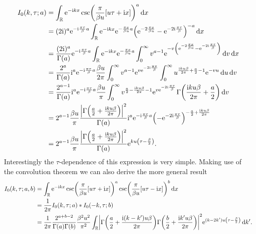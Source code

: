 \documentclass[english, parskip=full]{scrartcl}
\begin{document}
\begin{align}
I_0(k,\tau; a) &= \intr{\powe{-\i kx} \csc\kla*{\frac{\pi}{\beta u} \klb*{u\tau + \i x}}^a}{x} \\
&= (2\i)^a \powe{-\i \frac{\pi\tau}{\beta}a} \intr{\powe{-\i kx} \powe{-\frac{\pi x}{\beta u}a} \kla*{\powe{-2\frac{\pi x}{\beta u}} - \powe{-2\i\frac{\pi\tau}{\beta}}}^{-a} }{x}\\
&= \frac{(2\i)^a}{\Gamma(a)} \powe{-\i \frac{\pi\tau}{\beta}a} \intr{\powe{-\i kx} \powe{-\frac{\pi x}{\beta u}a } \intx{0}{\infty}{v^{a-1} \powe{-v\kla*{\powe{-2\frac{\pi x}{\beta u}} - \powe{-2\i\frac{\pi\tau}{\beta}}}} }{v}}{x}\\
&= \frac{2^{a}}{\Gamma(a)} \i^a \powe{-\i \frac{\pi\tau}{\beta}a} \frac{\beta u}{2\pi} \intx{0}{\infty}{v^{a-1} \powe{v\powe{-2\i\frac{\pi\tau}{\beta}}} \intx{0}{\infty}{u^{\frac{\i ku\beta}{2\pi} + \frac{a}{2} - 1} \powe{-vu}}{u} }{v}\\
&= \frac{2^{a-1}}{\Gamma(a)} \i^a \powe{-\i \frac{\pi\tau}{\beta}a} \frac{\beta u}{\pi} \intx{0}{\infty}{v^{\frac{a}{2} - \frac{\i ku\beta}{2\pi} - 1} \powe{v\powe{-2\i\frac{\pi\tau}{\beta}}} \Gamma\kla*{\frac{\i ku\beta}{2\pi} + \frac{a}{2}} }{v}\\
&= 2^{a-1} \frac{\beta u}{\pi} \frac{\abs*{\Gamma\kla*{\frac{a}{2} + \frac{\i ku\beta}{2\pi}}}^2}{\Gamma(a)} \i^a \powe{-\i \frac{\pi\tau}{\beta}a} \kla*{-\powe{-2\i\frac{\pi\tau}{\beta}}}^{-\frac{a}{2} + \frac{\i ku\beta}{2\pi}} \\
&= 2^{a-1} \frac{\beta u}{\pi} \frac{\abs*{\Gamma\kla*{\frac{a}{2} + \frac{\i ku\beta}{2\pi}}}^2}{\Gamma(a)} \powe{ku\kla*{\tau - \frac{\beta}{2}}}.
\end{align}
Interestingly the $\tau$-dependence of this expression is very simple.
Making use of the convolution theorem we can also derive the more general result
\begin{align}
I_0(k,\tau;a,b) &= \intr{\powe{-\i kx} \csc\kla*{\frac{\pi}{\beta u} \klb*{u\tau + \i x}}^a \csc\kla*{\frac{\pi}{\beta u} \klb*{u\tau - \i x}}^b}{x}\\
&= \frac{1}{2\pi} I_0(k,\tau;a) \ast I_0(-k,\tau;b)\\
&= \frac{1}{2\pi} \frac{2^{a+b-2}}{\Gamma(a)\Gamma(b)} \frac{\beta^2u^2}{\pi^2} \intr{ \abs*{\Gamma\kla*{\frac{a}{2} + \frac{\i (k-k')u\beta}{2\pi}} \Gamma\kla*{\frac{b}{2} + \frac{\i k'u\beta}{2\pi}}}^2 \powe{(k-2k') u\kla*{\tau - \frac{\beta}{2}}}}{k'}.
\end{align}
\end{document}
